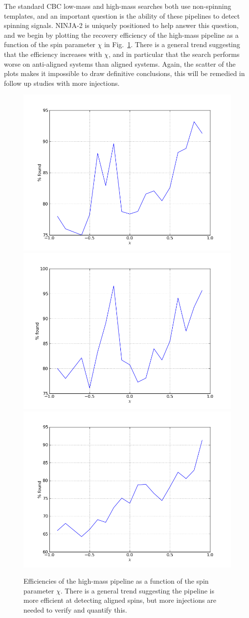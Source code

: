 The standard CBC low-mass and high-mass searches both use non-spinning
templates, and an important question is the ability of these pipelines
to detect spinning signals.  NINJA-2 is uniquely positioned to help
answer this question, and we begin by plotting the recovery efficiency
of the high-mass pipeline as a function of the spin parameter $\chi$
in Fig.~\ref{f:high_spin_efficiencies}.  There is a general trend
suggesting that the efficiency increases with $\chi$, and in
particular that the search performs worse on anti-aligned systems than
aligned systems.  Again, the scatter of the plots makes it
impossible to draw definitive conclusions, this will be remedied in
follow up studies with more injections.



\begin{figure}
  \includegraphics[width=0.5\linewidth]{figures/ninja2_results/H_second_spin_high_efficiency}
  \includegraphics[width=0.5\linewidth]{figures/ninja2_results/L_second_spin_high_efficiency} \\
  \includegraphics[width=0.5\linewidth]{figures/ninja2_results/V_second_spin_high_efficiency}
  \caption[Efficiency of the high-mass pipeline as a function of mass]{
  \label{f:high_spin_efficiencies}
Efficiencies of the high-mass pipeline as a function of the spin
parameter $\chi$.  There is a general trend suggesting the pipeline
is more efficient at detecting aligned spins, but more injections are
needed to verify and quantify this.
}
\end{figure}%


